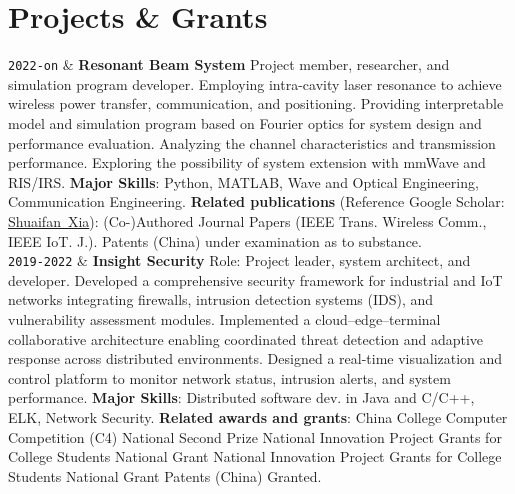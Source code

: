 \documentclass[9pt,a4paper]{article}
\newcommand{\FirstName}{Shuaifan}
\newcommand{\LastName}{Xia}
\newcommand{\MyName}{\FirstName\ \LastName}
\newcommand{\Duration}[2]{\fontsize{10pt}{0}\selectfont \texttt{#1-#2}}
\newcommand{\Ongoing}{on}
\newcommand{\Website}[1]{\href{https://#1}{#1}}
\begin{document}
\section{Projects \& Grants}

\begin{EntriesTableDuration}
  \Duration{2022}{\Ongoing} &
  \textbf{Resonant Beam System} %
  \hfill Project member, researcher, and simulation program developer.
  \newline
  Employing intra-cavity laser resonance to achieve wireless power transfer, communication, and positioning. 
  \newline Providing interpretable model and simulation program based on Fourier optics for system design and performance evaluation.
  \newline Analyzing the channel characteristics and transmission performance.
  \newline Exploring the possibility of system extension with mmWave and RIS/IRS.
  \newline \textbf{Major Skills}: Python, MATLAB, Wave and Optical Engineering, Communication Engineering.
  \newline 
  \textbf{Related publications} (Reference Google Scholar: \href{https://scholar.google.com/citations?user=x4Y8uCAAAAAJ}{\MyName}): 
   (Co-)Authored Journal Papers (IEEE Trans. Wireless Comm., IEEE IoT. J.).
   Patents (China) under examination as to substance.
  \\

  \Duration{2019}{2022} &
  \textbf{Insight Security} \hfill Role: Project leader, system architect, and developer.
  \newline
  Developed a comprehensive security framework for industrial and IoT networks integrating firewalls, intrusion detection systems (IDS), and vulnerability assessment modules.
	\newline
  Implemented a cloud–edge–terminal collaborative architecture enabling coordinated threat detection and adaptive response across distributed environments.
	\newline
  Designed a real-time visualization and control platform to monitor network status, intrusion alerts, and system performance.
	\newline \textbf{Major Skills}: Distributed software dev. in Java and C/C++, ELK, Network Security.
  \newline 
  \textbf{Related awards and grants}:
   China College Computer Competition (C4) 
  \hfill National Second Prize 
   National Innovation Project Grants for College Students
  \hfill National Grant
   National Innovation Project Grants for College Students
  \hfill National Grant
   Patents (China) Granted.
  \\


\end{EntriesTableDuration}
\end{document}
